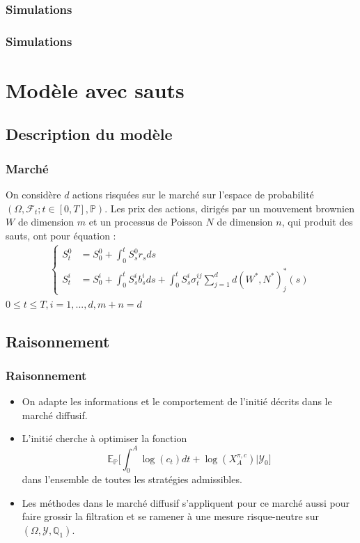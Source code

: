 \documentclass{beamer}
\begin{document}
\begin{frame}
\frametitle{Simulations}

\end{frame}

\begin{frame}
\frametitle{Simulations}

\end{frame}

\section{Modèle avec sauts}
\subsection{Description du modèle}

\begin{frame}
\frametitle{Marché}
On considère $d$ actions risquées sur le marché sur l'espace de probabilité $(\Omega, \mathcal{F}_t; t\in [0, T], \mathbb{P})$. Les prix des actions, dirigés par un mouvement brownien $W$ de dimension $m$ et un processus de Poisson $N$ de dimension $n$, qui produit des sauts, ont pour équation :
\begin{align*}
\begin{cases}
S^0_t &= S_0^0 + \int_{0}^{t} S^0_s r_s ds \\
S_t^i &= S_0^i + \int_{0}^{t}S_s^i b_s^i ds + \int_{0}^{t}S_s^i \sigma^{ij}_t \sum_{j = 1}^{d} d(W^*, N^*)^{*}_j(s) \end{cases}
\end{align*}
$ 0 \leq t \leq T, i = 1, ..., d, m+n = d$
\end{frame}

\subsection{Raisonnement}

\begin{frame}
\frametitle{Raisonnement}
\begin{itemize}
\item On adapte les informations et le comportement de l'initié décrits dans le marché diffusif. 
\item L'initié cherche à optimiser la fonction 
\begin{equation*}
\mathbb{E}_{\mathbb{P}} \Big[ \displaystyle \int_{0}^{A} \log (c_t)dt + \log(X_A^{\pi, c})\Big |\mathcal{Y}_0\Big]
\end{equation*}
dans l'ensemble de toutes les stratégies admissibles.
\item Les méthodes dans le marché diffusif s'appliquent pour ce marché aussi pour faire grossir la filtration et se ramener à une mesure risque-neutre sur $(\Omega, \mathcal{Y}, \mathbb{Q}_1)$.
\end{itemize}
\end{frame}
\end{document}
